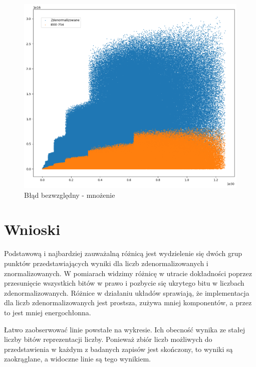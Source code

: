 \documentclass{article}
\begin{document}
\begin{figure}[H]
	\centering
	\includegraphics[height=0.4\textheight]{figures/mul_ulp.png}
	\caption{Błąd bezwzględny - mnożenie}
	\label{fig:mul_ulp}
\end{figure}


\section{Wnioski}
Podstawową i najbardziej zauważalną różnicą jest wydzielenie się dwóch grup punktów przedstawiających wyniki dla liczb zdenormalizowanych i znormalizowanych.
W pomiarach widzimy różnicę w utracie dokładności poprzez przesunięcie wszystkich bitów w prawo i pozbycie się ukrytego bitu w liczbach zdenormalizowanych.
Różnice w działaniu układów sprawiają, że implementacja dla liczb zdenormalizowanych jest prostsza, zużywa mniej komponentów, a przez to jest mniej energochłonna.

Łatwo zaobserwować linie powstałe na wykresie.
Ich obecność wynika ze stałej liczby bitów reprezentacji liczby.
Ponieważ zbiór liczb możliwych do przedstawienia w każdym z badanych zapisów jest skończony, to wyniki są zaokrąglane, a widoczne linie są tego wynikiem.








\newpage
{}
{}


\end{document}
